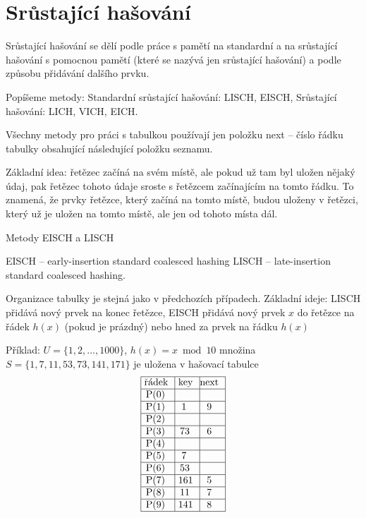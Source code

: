\documentclass[a4paper,12pt]{article}
\begin{document}
\section{Srůstající hašování}

Srůstající hašování se dělí podle práce s 
pamětí na standardní a na srůstající hašování 
s pomocnou pamětí (které se nazývá jen 
srůstající hašování) a podle způsobu 
přidávání dalšího prvku.

Popíšeme metody:\newline 
\phantom{---}Standardní srůstající hašování: LISCH, EISCH,\newline 
\phantom{---}Srůstající hašování: LICH, VICH, EICH.

Všechny metody pro práci s tabulkou používají jen 
položku next -- číslo řádku tabulky obsahující 
následující položku seznamu. 

Základní idea: řetězec začíná na svém místě, ale 
pokud už tam byl uložen 
nějaký údaj, pak řetězec tohoto údaje sroste s řetězcem 
začínajícím na tomto řádku. To znamená, že prvky řetězce, který začíná na tomto místě, budou uloženy v řetězci, který už je uložen na tomto místě, ale jen od tohoto místa dál.

\subhead
Metody EISCH a LISCH
\endsubhead

\phantom{---}EISCH -- early-insertion standard coalesced hashing\newline 
\phantom{---}LISCH -- late-insertion standard coalesced hashing.
 

Organizace tabulky je stejná jako v předchozích 
případech.\newline 
Základní ideje: LISCH přidává nový prvek na konec 
řetězce, \newline 
EISCH přidává nový prvek $x$ do řetězce na 
řádek $h(x)$ (pokud je prázdný) nebo hned za prvek na řádku $h(x)$\newline 

Příklad: $U=\{1,2,\dots,1000\}$, $h(x)=x\bmod10$\newline 
množina $S=\{1,7,11,53,73,141,171\}$ je uložena 
v hašovací tabulce
$$\vtop{\offinterlineskip\halign {\strut\vrule\ # & \vrule\ # & \vrule \hfil # \hfil \vrule\cr\noalign{\hrule}řádek & key & next \hfil \cr\noalign{\hrule}P(0) & &\hfill \cr\noalign{\hrule}P(1) & 1 & 9 \cr\noalign{\hrule}P(2) & &\hfill \cr\noalign{\hrule}P(3) & 73 & 6 \cr\noalign{\hrule}P(4) &  &\hfill \cr\noalign{\hrule}P(5) & 7 & \hfill \cr\noalign{\hrule}P(6) & 53 &\hfill \cr\noalign{\hrule}P(7) & 161 & 5 \cr\noalign{\hrule}P(8) & 11 & 7  \cr\noalign{\hrule}P(9) & 141 & 8 \cr\noalign{\hrule}}}$$
\end{document}
